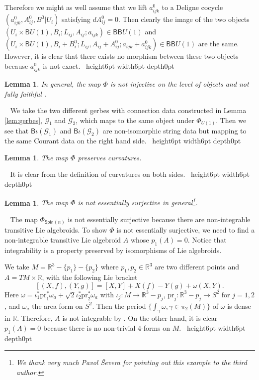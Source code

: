 \documentclass[letterpaper,10pt, oneside]{article} %
\newtheorem{lem}[thm]{Lemma}\newtheorem{lemma}[thm]{Lemma}
\newcommand{\Spin}{\mathsf{Spin}}%
\newcommand{\B}{\mathsf{B}}%
\newcommand{\pf}{\noindent{\bf Proof.}\ }
\newcommand{\R}{\mathbb R}\newcommand{\Z}{\mathbb Z}
\newcommand{\huaG}{\mathcal{G}}
\def\qed{\hfill ~\vrule height6pt width6pt depth0pt}
\newcommand{\pr}{\mathrm{pr}}
\begin{document}
Therefore we might as well assume that we lift $a^0_{ijk}$ to a Deligne cocycle $(a^0_{ijk}, A^0_{ij}, B^0|{U_i})$ satisfying $dA^0_{ij}=0$. Then clearly the image of the two objects $(U_i \times \B U(1), B_i;L_{ij},  A_{ij}; a_{ijk} ) \in \B \B U(1)$ and $(U_i \times \B U(1), B_i+B^0_i;L_{ij},  A_{ij}+A^0_{ij}; a_{ijk}+a^0_{ijk} ) \in \B \B U(1)$ are the same. However, it is clear that there exists no morphism between these two objects because $a^0_{ijk}$ is not exact.
\qed

\begin{lem}
In general, the map $\Phi$ is not injective on the level of objects and not fully faithful .
\end{lem}
\pf
We take the two different gerbes with connection data constructed in Lemma \ref{lem:gerbes},  $\huaG_1$ and $\huaG_2$,  which maps to the same object under $\Phi_{U(1)}$. Then we see that $\B\iota (\huaG_1)$ and $\B\iota (\huaG_2)$ are  non-isomorphic string data  but mapping to the same Courant data on the right hand side.
\qed



\begin{lem}\label{lem:curvature}
The map $\Phi$ preserves curvatures.
\end{lem}
\pf
It is clear from the definition of curvatures on both sides.
\qed



\begin{lem}
The map $\Phi$ is not essentially surjective in general\footnote{We thank very much Pavol \v{S}evera for pointing out this example to the third author.}.
\end{lem}
\pf
The map $\Phi_{\Spin(n)}$ is not essentially surjective because there are non-integrable transitive Lie algebroids. To show $\Phi$ is not essentially surjective, we need to find a non-integrable transitive Lie algebroid $A$ whose $p_1(A)=0$. Notice that integrability is a property preserved by isomorphisms of Lie algebroids.

We take $M=\R^3-\{p_1\}-\{p_2\}$ where $p_1, p_2\in \R^3$ are two different points and $A=TM\times \R$, with the following Lie bracket
\[
[(X, f), (Y, g)]=[X, Y]+ X(f)-Y(g)+\omega(X, Y).
\] Here $\omega = \iota_1^* \pr_1^* \omega_a + \sqrt{2} \iota_2^* \pr_2^* \omega_a$ with $\iota_j :  M\to \R^3- p_j  $,  $\pr_j: \R^3- p_j  \to S^2$ for $j=1,2$,  and $\omega_a$ the area form on $S^2$. Then the period $\{ \int_{\gamma}\omega, \gamma \in \pi_2(M)\} $ of $\omega$ is dense in $\R$. Therefore, $A$ is not integrable by \cite{cf}. On the other hand, it is clear $p_1(A)=0$ because there is no non-trivial 4-forms on $M$.
\qed
\end{document}
